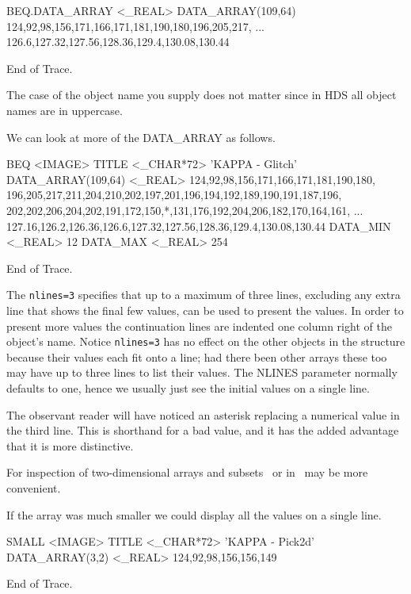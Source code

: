 \documentclass[11pt,nolof]{starlink}
\begin{document}
\small
\begin{terminalv}

BEQ.DATA_ARRAY  <_REAL>
  DATA_ARRAY(109,64)  124,92,98,156,171,166,171,181,190,180,196,205,217,
                      ... 126.6,127.32,127.56,128.36,129.4,130.08,130.44

End of Trace.
\end{terminalv}
\normalsize
The case of the object name you supply does not matter since in HDS all
object names are in uppercase.

We can look at more of the DATA\_ARRAY as follows.

\small
\begin{terminalv}

BEQ  <IMAGE>
  TITLE          <_CHAR*72>      'KAPPA - Glitch'
  DATA_ARRAY(109,64)  <_REAL>    124,92,98,156,171,166,171,181,190,180,
   196,205,217,211,204,210,202,197,201,196,194,192,189,190,191,187,196,
   202,202,206,204,202,191,172,150,*,131,176,192,204,206,182,170,164,161,
   ... 127.16,126.2,126.36,126.6,127.32,127.56,128.36,129.4,130.08,130.44
  DATA_MIN       <_REAL>         12
  DATA_MAX       <_REAL>         254

End of Trace.
\end{terminalv}
\normalsize
The \texttt{nlines=3} specifies that up to a maximum of three lines,
excluding any extra line that shows the final few values, can be
used to present the values.  In order to present more values the
continuation lines are indented one column right of the object's name.
Notice \texttt{nlines=3} has no effect on the other objects in the
structure because their values each fit onto a line; had there been
other arrays these too may have up to three lines to list their
values.  The NLINES parameter normally defaults to one, hence we usually
just see the initial values on a single line.

The observant reader will have noticed an asterisk replacing a numerical
value in the third line.  This is shorthand for a bad value, and it
has the added advantage that it is more distinctive.

For inspection of two-dimensional arrays and subsets \GAIAref\ or
 in \KAPPA\ may be more convenient.

If the array was much smaller we could display all the values on a single
line.

\small
\begin{terminalv}

SMALL  <IMAGE>
  TITLE          <_CHAR*72>      'KAPPA - Pick2d'
  DATA_ARRAY(3,2)  <_REAL>       124,92,98,156,156,149

End of Trace.
\end{terminalv}
\normalsize
\end{document}
